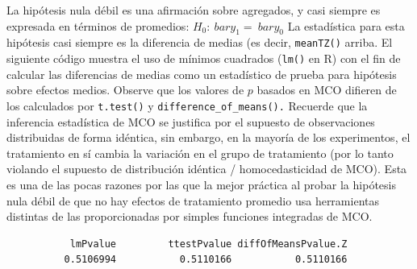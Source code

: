 \documentclass[
]{article}
\newenvironment{Shaded}{\begin{snugshade}}{\end{snugshade}}
\newcommand{\AttributeTok}[1]{\textcolor[rgb]{0.77,0.63,0.00}{#1}}
\newcommand{\FunctionTok}[1]{\textcolor[rgb]{0.00,0.00,0.00}{#1}}
\newcommand{\NormalTok}[1]{#1}
\newcommand{\OtherTok}[1]{\textcolor[rgb]{0.56,0.35,0.01}{#1}}
\newcommand{\SpecialCharTok}[1]{\textcolor[rgb]{0.00,0.00,0.00}{#1}}
\newcommand{\StringTok}[1]{\textcolor[rgb]{0.31,0.60,0.02}{#1}}
\begin{document}
La hipótesis nula débil es una afirmación sobre agregados, y casi siempre es expresada en términos de promedios: \(H_0: \ bar {y} _ {1} = \ bar {y} _ {0}\) La estadística para esta hipótesis casi siempre es la diferencia de medias (es decir,
\texttt{meanTZ()} arriba. El siguiente código muestra el uso de mínimos cuadrados (\texttt{lm()} en R)
con el fin de calcular las diferencias de medias como un estadístico de prueba para
hipótesis sobre efectos medios. Observe que los valores de \(p\) basados en MCO difieren
de los calculados por \texttt{t.test()} y \texttt{difference\_of\_means().} Recuerde que
la inferencia estadística de MCO se justifica por el supuesto de
observaciones distribuidas de forma idéntica, sin embargo, en la mayoría de los experimentos, el tratamiento en sí cambia la variación en el grupo de tratamiento (por lo tanto
violando el supuesto de distribución idéntica / homocedasticidad de MCO). Esta es una de las pocas razones por las que la mejor práctica al probar la hipótesis nula débil de que no hay efectos de tratamiento promedio usa herramientas distintas de las proporcionadas por simples funciones integradas de MCO.

\begin{Shaded}
\end{Shaded}

\begin{verbatim}
           lmPvalue         ttestPvalue diffOfMeansPvalue.Z 
          0.5106994           0.5110166           0.5110166 
\end{verbatim}
\end{document}
